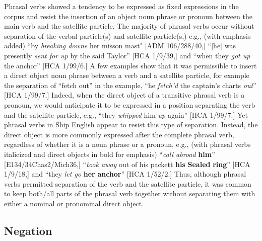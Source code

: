   Phrasal verbs showed a tendency to be expressed as fixed expressions in the corpus and resist the insertion of an object noun phrase or pronoun between the main verb and the satellite particle. The majority of phrasal verbs occur without separation of the verbal particle(s) and satellite particle(s,) e.g., (with emphasis added) “by \textit{breaking downe} her misson mast" [ADM 106/288/40,] “[he] was presently \textit{sent for up} by the said Taylor” [HCA 1/9/39,] and “when they \textit{got up} the anchor” [HCA 1/99/6.] A few examples show that it was permissible to insert a direct object noun phrase between a verb and a satellite particle, for example the separation of “fetch out” in the example, “he \textit{fetch’d} the captain’s charts \textit{out}” [HCA 1/99/7.] Indeed, when the direct object of a transitive phrasal verb is a pronoun, we would anticipate it to be expressed in a position separating the verb and the satellite particle, e.g., “they \textit{whipped} him \textit{up} again” [HCA 1/99/7.] Yet phrasal verbs in Ship English appear to resist this type of separation. Instead, the direct object is more commonly expressed after the complete phrasal verb, regardless of whether it is a noun phrase or a pronoun, e.g., (with phrasal verbs italicized and direct objects in bold for emphasis) “\textit{call abroad} \textbf{him}” [E134/34Chas2/Mich36,] “\textit{took away} out of his packett \textbf{his} \textbf{Sealed} \textbf{ring}” [HCA 1/9/18,] and “they \textit{let go} \textbf{her} \textbf{anchor}” [HCA 1/52/2.] Thus, although phrasal verbs permitted separation of the verb and the satellite particle, it was common to keep both/all parts of the phrasal verb together without separating them with either a nominal or pronominal direct object. 

\subsection{{Negation}}%

